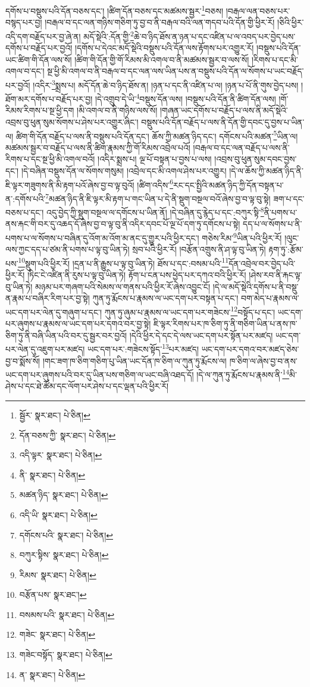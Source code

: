 དགོས་པ་བསྡུས་པའི་དོན་བཅས་དང་། །ཚིག་དོན་བཅས་དང་མཚམས་སྦྱར་\footnote{སྦྱོར་  སྣར་ཐང་།  པེ་ཅིན། }བཅས། །བརྒལ་ལན་བཅས་པར་བསྙད་པར་བྱ། །བརྒལ་བ་དང་ལན་གཉིས་གཅིག་ཏུ་བྱ་བ་ནི་བརྒལ་བའི་ལན་གདབ་པའི་དོན་གྱི་ཕྱིར་རོ། །ཅིའི་ཕྱིར་འདི་དག་བརྗོད་པར་བྱ་ཞེ་ན། མདོ་སྡེའི་:དོན་གྱི་\footnote{དོན་བཅས་ཀྱི་  སྣར་ཐང་།  པེ་ཅིན། }ཆེ་བ་ཉིད་ཐོས་ན་ཉན་པ་དང་འཛིན་པ་ལ་འབད་པར་བྱེད་པས་དགོས་པ་བརྗོད་པར་བྱའོ། །དགོས་པ་དེའང་མདོ་སྡེའི་བསྡུས་པའི་དོན་ལས་རྟོགས་པར་འགྱུར་རོ། །བསྡུས་པའི་དོན་ཡང་ཚིག་གི་དོན་ལས་སོ། །ཚིག་གི་དོན་གྱི་གོ་རིམས་མི་འགལ་བ་ནི་མཚམས་སྦྱར་བ་ལས་སོ། །རིགས་པ་དང་མི་འགལ་བ་དང་། སྔ་ཕྱི་མི་འགལ་བ་ནི་བརྒལ་བ་དང་ལན་ལས་ཡིན་པས་ན་བསྡུས་པའི་དོན་ལ་སོགས་པ་ཡང་བརྗོད་པར་བྱའོ། །འདིར་\footnote{འདི་ལྟར་  སྣར་ཐང་།  པེ་ཅིན། }སྨྲས་པ། མདོ་དོན་ཆེ་བ་ཉིད་ཐོས་ན། །ཉན་པ་དང་ནི་འཛིན་པ་ལ། །ཉན་པ་པོ་ནི་གུས་བྱེད་པས། །ཐོག་མར་དགོས་པ་བརྗོད་པར་བྱ། །དེ་འགྲུབ་དེ་ཡི་\footnote{ནི་  སྣར་ཐང་།  པེ་ཅིན། }བསྡུས་དོན་ལས། །བསྡུས་པའི་དོན་ནི་ཚིག་དོན་ལས། །གོ་རིམས་རིགས་པ་སྔ་ཕྱི་དག །མི་འགལ་བ་ནི་གཉིས་ལས་སོ། །གཞན་ཡང་དགོས་པ་བརྗོད་པ་ལས་ནི་མདོ་སྡེའི་འབྲས་བུ་ཕུན་སུམ་སོགས་པ་ཤེས་པར་འགྱུར་ཞིང་། བསྡུས་པའི་དོན་བརྗོད་པ་ལས་ནི་དོན་གྱི་དབང་དུ་བྱས་པ་ཡིན་ལ། ཚིག་གི་དོན་བརྗོད་པ་ལས་ནི་བསྡུས་པའི་དོན་དང་། ཆོས་ཀྱི་མཚན་ཉིད་དང་། དགོངས་པའི་མཚན་\footnote{མཚན་ཉིད་  སྣར་ཐང་།  པེ་ཅིན། }ཡིན་ལ། མཚམས་སྦྱར་བ་བརྗོད་པ་ལས་ནི་ཚིག་རྣམས་ཀྱི་གོ་རིམས་འབྲེལ་པའོ། །བརྒལ་བ་དང་ལན་བརྗོད་པ་ལས་ནི་རིགས་པ་དང་སྔ་ཕྱི་མི་འགལ་བའོ། །འདིར་སྨྲས་པ། ལྔ་པོ་བསྟན་པ་བྱས་པ་ལས། །འབྲས་བུ་ཕུན་སུམ་དབང་བྱས་དང་། །དེ་བཞིན་བསྡུས་དོན་ལ་སོགས་གསུམ། །འབྲེལ་དང་མི་འགལ་ཤེས་པར་འགྱུར། །དེ་ལ་ཆོས་ཀྱི་མཚན་ཉིད་ནི་ཇི་ལྟར་གཟུགས་ནི་མི་རྟག་པའོ་ཞེས་བྱ་བ་ལྟ་བུའོ། །ཚིག་འདིས་\footnote{འདི་ཡི་  སྣར་ཐང་།  པེ་ཅིན། }རང་དང་སྤྱིའི་མཚན་ཉིད་ཀྱི་དོན་བསྟན་པ་ན་:དགོས་པའི་\footnote{དགོངས་པའི་  སྣར་ཐང་།  པེ་ཅིན། }མཚན་ཉིད་ནི་ཇི་ལྟར་མི་རྟག་པ་གང་ཡིན་པ་དེ་ནི་སྡུག་བསྔལ་བའོ་ཞེས་བྱ་བ་ལྟ་བུ་སྟེ། ཟག་པ་དང་བཅས་པ་དང་། འདུ་བྱེད་ཀྱི་སྡུག་བསྔལ་ལ་དགོངས་པ་ཡིན་ནོ། །དེ་བཞིན་དུ་རྙེད་པ་དང་:བཀུར་སྟི་\footnote{བཀུར་སྟིས་  སྣར་ཐང་།  པེ་ཅིན། }ནི་པགས་པ་ནས་རྐང་གི་བར་དུ་འཆད་དོ་ཞེས་བྱ་བ་ལྟ་བུ་ནི་འདིར་དབང་པོ་ལྔ་པོ་དག་ཏུ་དགོངས་པ་སྟེ། དད་པ་ལ་སོགས་པ་ནི་པགས་པ་ལ་སོགས་པ་བཞིན་དུ་འོག་མ་འོག་མ་ནང་དུ་གྱུར་པའི་ཕྱིར་དང་། གཅེས་རིམ་\footnote{རིམས་  སྣར་ཐང་།  པེ་ཅིན། }ཡིན་པའི་ཕྱིར་རོ། །ལུང་ལས་ཀྱང་དད་པ་ཙམ་ནི་པགས་པ་ལྟ་བུ་ཡིན་ཏེ། སྲབ་པའི་ཕྱིར་རོ། །བརྩོན་འགྲུས་ནི་ཤ་ལྟ་བུ་ཡིན་ཏེ། རྟག་ཏུ་:རྩོམ་པས་\footnote{བརྩོན་པས་  སྣར་ཐང་། }སྡུག་པའི་ཕྱིར་རོ། །དྲན་པ་ནི་རྒྱུས་པ་ལྟ་བུ་ཡིན་ཏེ། ཐོས་པ་དང་:བསམ་པའི་\footnote{བསམས་པའི་  སྣར་ཐང་།  པེ་ཅིན། }དོན་འབྲེལ་བར་བྱེད་པའི་ཕྱིར་རོ། །ཏིང་ངེ་འཛིན་ནི་རུས་པ་ལྟ་བུ་ཡིན་ཏེ། རྟོག་པ་ངན་པས་ཕྱེད་པར་དཀའ་བའི་ཕྱིར་རོ། །ཤེས་རབ་ནི་རྐང་ལྟ་བུ་ཡིན་ཏེ། མཉམ་པར་གཞག་པའི་སེམས་ལ་གནས་པའི་ཕྱིར་རོ་ཞེས་འབྱུང་ངོ། །དེ་ལ་མདོ་སྡེའི་དགོས་པ་ནི་བསྡུ་ན་རྣམ་པ་བཞིར་རིག་པར་བྱ་སྟེ། ཀུན་ཏུ་རྨོངས་པ་རྣམས་ལ་ཡང་དག་པར་བསྟན་པ་དང་། བག་མེད་པ་རྣམས་ལ་ཡང་དག་པར་ལེན་དུ་གཞུག་པ་དང་། ཀུན་ཏུ་ཞུམ་པ་རྣམས་ལ་ཡང་དག་པར་གཟེངས་\footnote{གཟེང་  སྣར་ཐང་།  པེ་ཅིན། }བསྟོད་པ་དང་། ཡང་དག་པར་ཞུགས་པ་རྣམས་ལ་ཡང་དག་པར་དགའ་བར་བྱ་སྟེ། ཇི་ལྟར་རིགས་པར་ཁ་ཅིག་ཏུ་ནི་གཅིག་ཡིན་པ་ནས་ཁ་ཅིག་ཏུ་ནི་བཞི་ཡིན་པའི་བར་དུ་སྦྱར་བར་བྱའོ། །དེའི་ཕྱིར་དེ་དང་དེ་ལས་ཡང་དག་པར་སྟོན་པར་མཛད། ཡང་དག་པར་ལེན་དུ་འཇུག་པར་མཛད། ཡང་དག་པར་:གཟེངས་སྟོད་\footnote{གཟེང་བསྟོད་  སྣར་ཐང་།  པེ་ཅིན། }པར་མཛད། ཡང་དག་པར་དགའ་བར་མཛད་ཅེས་བྱ་བ་སྨོས་སོ། །གང་ཟག་ཁ་ཅིག་གཅིག་པུ་ཡིན་ཡང་དོན་ཁ་ཅིག་ལ་ཀུན་ཏུ་རྨོངས་ལ། ཁ་ཅིག་ལ་ཞེས་བྱ་བ་ནས་ཡང་དག་པར་ཞུགས་པའི་བར་དུ་ཡིན་པས་གཅིག་ལ་ཡང་བཞི་འཐད་དོ། །དེ་ལ་ཀུན་ཏུ་རྨོངས་པ་རྣམས་ནི་\footnote{ན་  སྣར་ཐང་།  པེ་ཅིན། }མི་ཤེས་པ་དང་ཐེ་ཚོམ་དང་ལོག་པར་ཤེས་པ་དང་ལྡན་པའི་ཕྱིར་རོ། 